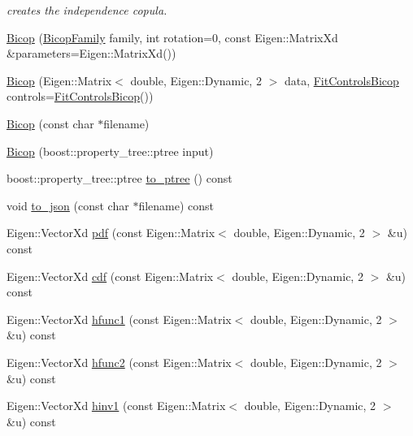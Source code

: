 \begin{DoxyCompactItemize}
\begin{DoxyCompactList}\small\item\em creates the independence copula. \end{DoxyCompactList}\item 
\hyperlink{classvinecopulib_1_1_bicop_ab27f789e001e30f2fed7f9ecefdeffb0}{Bicop} (\hyperlink{namespacevinecopulib_a42e95cc06d33896199caab0c11ad44f3}{Bicop\+Family} family, int rotation=0, const Eigen\+::\+Matrix\+Xd \&parameters=Eigen\+::\+Matrix\+Xd())
\item 
\hyperlink{classvinecopulib_1_1_bicop_afc8b465d9e02a3df1c25f7c1e7ac9240}{Bicop} (Eigen\+::\+Matrix$<$ double, Eigen\+::\+Dynamic, 2 $>$ data, \hyperlink{classvinecopulib_1_1_fit_controls_bicop}{Fit\+Controls\+Bicop} controls=\hyperlink{classvinecopulib_1_1_fit_controls_bicop}{Fit\+Controls\+Bicop}())
\item 
\hyperlink{classvinecopulib_1_1_bicop_aebe3a41e3f23817f0234fa789c443a98}{Bicop} (const char $\ast$filename)
\item 
\hyperlink{classvinecopulib_1_1_bicop_a1ecfc508b6aa5ed5b67515eb5c116986}{Bicop} (boost\+::property\+\_\+tree\+::ptree input)
\item 
boost\+::property\+\_\+tree\+::ptree \hyperlink{classvinecopulib_1_1_bicop_a74aeb9fd66cee77afd30c8a29dbd5040}{to\+\_\+ptree} () const 
\item 
void \hyperlink{classvinecopulib_1_1_bicop_a7a4f0d508461a5a44ef1fbb2cd4dd29e}{to\+\_\+json} (const char $\ast$filename) const 
\item 
Eigen\+::\+Vector\+Xd \hyperlink{classvinecopulib_1_1_bicop_a0ee385fbc68736ebc6ddd52188686108}{pdf} (const Eigen\+::\+Matrix$<$ double, Eigen\+::\+Dynamic, 2 $>$ \&u) const 
\item 
Eigen\+::\+Vector\+Xd \hyperlink{classvinecopulib_1_1_bicop_a943bb4f2df548fd2d02966157eddb27b}{cdf} (const Eigen\+::\+Matrix$<$ double, Eigen\+::\+Dynamic, 2 $>$ \&u) const 
\item 
Eigen\+::\+Vector\+Xd \hyperlink{classvinecopulib_1_1_bicop_afd3ebf9b214e64d84238302df7950eee}{hfunc1} (const Eigen\+::\+Matrix$<$ double, Eigen\+::\+Dynamic, 2 $>$ \&u) const 
\item 
Eigen\+::\+Vector\+Xd \hyperlink{classvinecopulib_1_1_bicop_a65492e3c4332b8661b3bd86d00ee5d3b}{hfunc2} (const Eigen\+::\+Matrix$<$ double, Eigen\+::\+Dynamic, 2 $>$ \&u) const 
\item 
Eigen\+::\+Vector\+Xd \hyperlink{classvinecopulib_1_1_bicop_a909d10dfb1a6cbbf95f051958f79b861}{hinv1} (const Eigen\+::\+Matrix$<$ double, Eigen\+::\+Dynamic, 2 $>$ \&u) const 

\end{DoxyCompactItemize}
